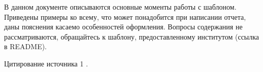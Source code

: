 \introduction %

В данном документе описываются основные моменты работы с шаблоном. Приведены примеры ко всему, что может понадобится при написании отчета, даны пояснения касаемо особенностей оформления. Вопросы содержания не рассматриваются, обращайтесь к шаблону, предоставленному институтом (ссылка в README).

Цитирование источника 1 \cite{Wikipedia1}.
